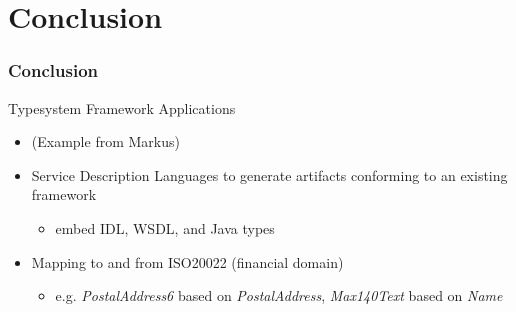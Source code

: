 \section{Conclusion}

\begin{frame}
  \frametitle{Conclusion}
  
  Typesystem Framework Applications
  \begin{itemize}
    \item (Example from Markus)
    \item Service Description Languages to generate artifacts conforming
    to an existing framework
    \begin{itemize}
      \item embed IDL, WSDL, and Java types
    \end{itemize}
    \item Mapping to and from ISO20022 (financial domain)
    \begin{itemize}
      \item e.g. \emph{PostalAddress6} based on \emph{PostalAddress},
      \emph{Max140Text} based on \emph{Name}
    \end{itemize}
  \end{itemize}
  
\end{frame}

